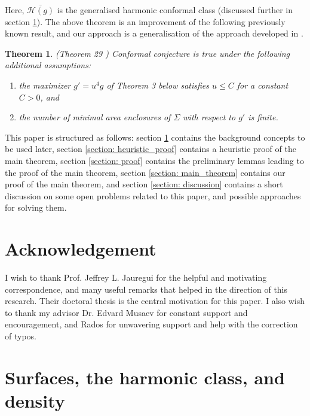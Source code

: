 \documentclass{amsart}
\newtheorem{theorem}{Theorem}
\theoremstyle{named}
\begin{document}
Here, $\overline{\mathcal{H}(g)}$ is the generalised harmonic conformal class (discussed further in section \ref{section: formalisms}). The above theorem is an improvement of the following previously known result, and our approach is a generalisation of the approach developed in \cite{jeff}.

\begin{theorem} \label{theorem: maintheorem_jau} (Theorem 29 \cite{jeff})
    Conformal conjecture is true under the following additional assumptions:
    \begin{enumerate}
        \item the maximizer $g' = u^4g$ of Theorem 3 below satisfies $u \leq C$ for a constant $C > 0$, and
        \item the number of minimal area enclosures of $\Sigma$ with respect to $g'$ is finite.
    \end{enumerate}
\end{theorem}

This paper is structured as follows: section \ref{section: formalisms} contains the background concepts to be used later, section \ref{section: heuristic_proof} contains a heuristic proof of the main theorem, section \ref{section: proof} contains the preliminary lemmas leading to the proof of the main theorem, section \ref{section: main_theorem} contains our proof of the main theorem, and section \ref{section: discussion} contains a short discussion on some open problems related to this paper, and possible approaches for solving them.


\section*{Acknowledgement}

I wish to thank Prof. Jeffrey L. Jauregui for the helpful and motivating correspondence, and many useful remarks that helped in the direction of this research. Their doctoral thesis is the central motivation for this paper. I also wish to thank my advisor Dr. Edvard Musaev for constant support and encouragement, and Rados for unwavering support and help with the correction of typos.


\section{Surfaces, the harmonic class, and density} \label{section: formalisms}
\end{document}
